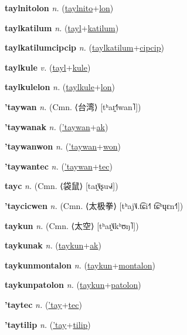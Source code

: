 \textbf{\hypertarget{taylnitolon}{taylnitolon}} \textit{n.} (\hyperlink{taylnito}{taylnito}+\allowbreak \hyperlink{lon}{lon})


\textbf{\hypertarget{taylkatilum}{taylkatilum}} \textit{n.} (\hyperlink{tayl}{tayl}+\allowbreak \hyperlink{katilum}{katilum})


\textbf{\hypertarget{taylkatilumcipcip}{taylkatilumcipcip}} \textit{n.} (\hyperlink{taylkatilum}{taylkatilum}+\allowbreak \hyperlink{cipcip}{cipcip})


\textbf{\hypertarget{taylkule}{taylkule}} \textit{v.} (\hyperlink{tayl}{tayl}+\allowbreak \hyperlink{kule}{kule})


\textbf{\hypertarget{taylkulelon}{taylkulelon}} \textit{n.} (\hyperlink{taylkule}{taylkule}+\allowbreak \hyperlink{lon}{lon})


\textbf{\hypertarget{'taywan}{'taywan}} \textit{n.} (Cmn. ⟨{\chinese{}台湾}⟩ [tʰaɪ̯˧˥wan˥])


\textbf{\hypertarget{'taywanak}{'taywanak}} \textit{n.} (\hyperlink{'taywan}{'taywan}+\allowbreak \hyperlink{ak}{ak})


\textbf{\hypertarget{'taywanwon}{'taywanwon}} \textit{n.} (\hyperlink{'taywan}{'taywan}+\allowbreak \hyperlink{won}{won})


\textbf{\hypertarget{'taywantec}{'taywantec}} \textit{n.} (\hyperlink{'taywan}{'taywan}+\allowbreak \hyperlink{tec}{tec})


\textbf{\hypertarget{tayc}{tayc}} \textit{n.} (Cmn. ⟨{\chinese{}袋鼠}⟩ [taɪ̯˥˩ʂu˧˩˧])


\textbf{\hypertarget{'taycicwen}{'taycicwen}} \textit{n.} (Cmn. ⟨{\chinese{}太极拳}⟩ [tʰaj˥˩.t͡ɕi˧˥ t͡ɕʰɥɛn˧˥])


\textbf{\hypertarget{taykun}{taykun}} \textit{n.} (Cmn. ⟨{\chinese{}太空}⟩ [tʰaɪ̯˥˩kʰʊŋ˥])


\textbf{\hypertarget{taykunak}{taykunak}} \textit{n.} (\hyperlink{taykun}{taykun}+\allowbreak \hyperlink{ak}{ak})


\textbf{\hypertarget{taykunmontalon}{taykunmontalon}} \textit{n.} (\hyperlink{taykun}{taykun}+\allowbreak \hyperlink{montalon}{montalon})


\textbf{\hypertarget{taykunpatolon}{taykunpatolon}} \textit{n.} (\hyperlink{taykun}{taykun}+\allowbreak \hyperlink{patolon}{patolon})


\textbf{\hypertarget{'taytec}{'taytec}} \textit{n.} (\hyperlink{'tay}{'tay}+\allowbreak \hyperlink{tec}{tec})


\textbf{\hypertarget{'taytilip}{'taytilip}} \textit{n.} (\hyperlink{'tay}{'tay}+\allowbreak \hyperlink{tilip}{tilip})


